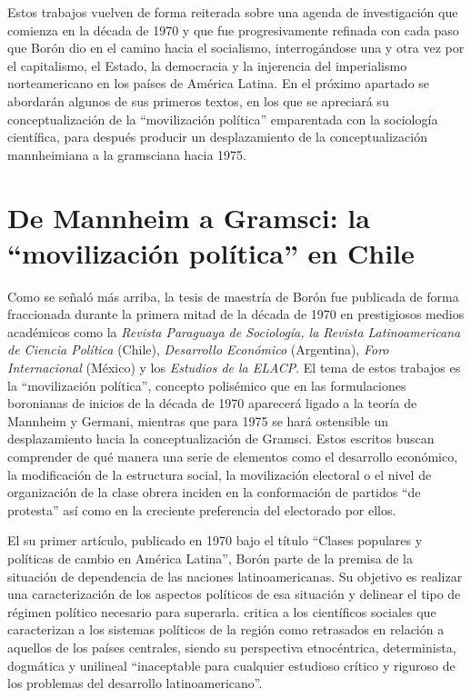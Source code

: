 Estos trabajos vuelven de forma reiterada sobre una agenda de investigación que comienza en la década de 1970 y que fue progresivamente refinada con cada paso que Borón dio en el camino hacia el socialismo, interrogándose una y otra vez por el capitalismo, el Estado, la democracia y la injerencia del imperialismo norteamericano en los países de América Latina. En el próximo apartado se abordarán algunos de sus primeros textos, en los que se apreciará su conceptualización de la \enquote{movilización política} emparentada con la sociología científica, para después producir un desplazamiento de la conceptualización mannheimiana a la gramsciana hacia 1975.

\section{De Mannheim a Gramsci: la \enquote{movilización política} en Chile}

Como se señaló más arriba, la tesis de maestría de Borón fue publicada de forma fraccionada durante la primera mitad de la década de 1970 en prestigiosos medios académicos como la \emph{Revista Paraguaya de Sociología, la Revista Latinoamericana de Ciencia Política} (Chile), \emph{Desarrollo Económico} (Argentina), \emph{Foro Internacional} (México) y los \emph{Estudios de la ELACP}. El tema de estos trabajos es la \enquote{movilización política}, concepto polisémico que en las formulaciones boronianas de inicios de la década de 1970 aparecerá ligado a la teoría de Mannheim y Germani, mientras que para 1975 se hará ostensible un desplazamiento hacia la conceptualización de Gramsci. Estos escritos buscan comprender de qué manera una serie de elementos como el desarrollo económico, la modificación de la estructura social, la movilización electoral o el nivel de organización de la clase obrera inciden en la conformación de partidos \enquote{de protesta} así como en la creciente preferencia del electorado por ellos.

El su primer artículo, publicado en 1970 bajo el título \enquote{Clases populares y políticas de cambio en América Latina}, Borón parte de la premisa de la situación de dependencia de las naciones latinoamericanas. Su objetivo es realizar una caracterización de los aspectos políticos de esa situación y delinear el tipo de régimen político necesario para superarla. \textcite[101]{1569-BORON2020} critica a los científicos sociales que caracterizan a los sistemas políticos de la región como retrasados en relación a aquellos de los países centrales, siendo su perspectiva etnocéntrica, determinista, dogmática y unilineal \enquote{inaceptable para cualquier estudioso crítico y riguroso de los problemas del desarrollo latinoamericano}.

